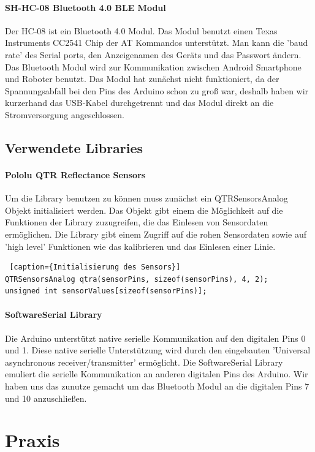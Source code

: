 \documentclass[12pt]{article}
\begin{document}
\paragraph{SH-HC-08 Bluetooth 4.0 BLE Modul} Der HC-08 ist ein Bluetooth 4.0 Modul. Das Modul benutzt einen Texas Instruments CC2541 Chip der AT Kommandos unterstützt. Man kann die 'baud rate' des Serial ports, den Anzeigenamen des Geräts und das Passwort ändern. Das Bluetooth Modul wird zur Kommunikation zwischen Android Smartphone und Roboter benutzt. Das Modul hat zunächst nicht funktioniert, da der Spannungsabfall bei den Pins des Arduino schon zu groß war, deshalb haben wir kurzerhand das USB-Kabel durchgetrennt und das Modul direkt an die Stromversorgung angeschlossen.
\subsection{Verwendete Libraries}
\paragraph{Pololu QTR Reflectance Sensors}
\cite{QTR}
Um die Library benutzen zu können muss zunächst ein QTRSensorsAnalog Objekt initialisiert werden. Das Objekt gibt einem die Möglichkeit auf die Funktionen der Library zuzugreifen, die das Einlesen von Sensordaten ermöglichen. Die Library gibt einem Zugriff auf die rohen Sensordaten sowie auf 'high level' Funktionen wie das kalibrieren und das Einlesen einer Linie. 

\begin{lstlisting} [caption={Initialisierung des Sensors}] 
QTRSensorsAnalog qtra(sensorPins, sizeof(sensorPins), 4, 2);
unsigned int sensorValues[sizeof(sensorPins)];
\end{lstlisting}

\paragraph{SoftwareSerial Library} \cite{SoftwareSerial}
Die Arduino unterstützt native serielle Kommunikation auf den digitalen Pins 0 und 1. Diese native serielle Unterstützung wird durch den eingebauten 'Universal asynchronous receiver/transmitter' ermöglicht. Die SoftwareSerial Library emuliert die serielle Kommunikation an anderen digitalen Pins des Arduino. Wir haben uns das zunutze gemacht um das Bluetooth Modul an die  digitalen Pins 7 und 10  anzuschließen. 

\section{Praxis}
\end{document}
